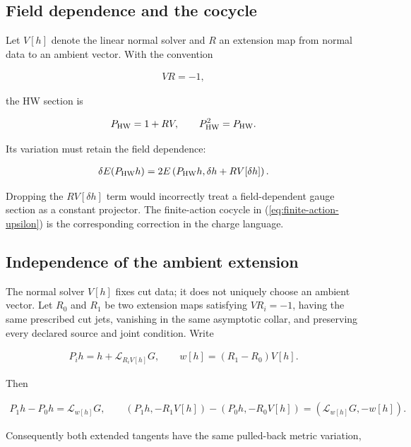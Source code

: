 \subsection{Field dependence and the cocycle}

Let $V[h]$ denote the linear normal solver and $R$ an extension map from normal data to an ambient vector. With the convention

\begin{align}
VR=-1,
\end{align}

the HW section is

\begin{align}
P_{\rm HW}=1+RV,
\qquad
P_{\rm HW}^2=P_{\rm HW}.
\end{align}

Its variation must retain the field dependence:

\begin{align}
\delta E(P_{\rm HW}h)
=2E\left(P_{\rm HW}h,
\delta h+RV[\delta h]\right).
\end{align}

Dropping the $RV[\delta h]$ term would incorrectly treat a field-dependent gauge section as a constant projector. The finite-action cocycle in (\ref{eq:finite-action-upsilon}) is the corresponding correction in the charge language.

\subsection{Independence of the ambient extension}\label{subsec:extension-independence}

The normal solver $V[h]$ fixes cut data; it does not uniquely choose an ambient vector. Let $R_0$ and $R_1$ be two extension maps satisfying $VR_i=-1$, having the same prescribed cut jets, vanishing in the same asymptotic collar, and preserving every declared source and joint condition. Write

\begin{align}
P_i h=h+\mathcal L_{R_iV[h]}G,
\qquad
w[h]=(R_1-R_0)V[h].
\end{align}

Then

\begin{align}
P_1h-P_0h=\mathcal L_{w[h]}G,
\qquad
(P_1h,-R_1V[h])-(P_0h,-R_0V[h])
=(\mathcal L_{w[h]}G,-w[h]).
\label{eq:extension-change}
\end{align}

Consequently both extended tangents have the same pulled-back metric variation,

